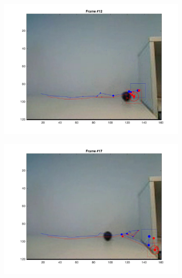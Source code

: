 \documentclass{ethz_report}
\begin{document}
\begin{figure}[h]
\begin{subfigure}[b]{.25\textwidth}
    \end{subfigure}%
    \begin{subfigure}[b]{.25\textwidth}
        \centering
        \includegraphics[width=1\linewidth]{images/video3_noise_high_11}
    \end{subfigure}%
    \begin{subfigure}[b]{.25\textwidth}
        \centering
        \includegraphics[width=1\linewidth]{images/video3_noise_high_16}
    \end{subfigure}
    \begin{subfigure}[b]{.25\textwidth}
        \centering

\end{subfigure}
\end{figure}
\end{document}
